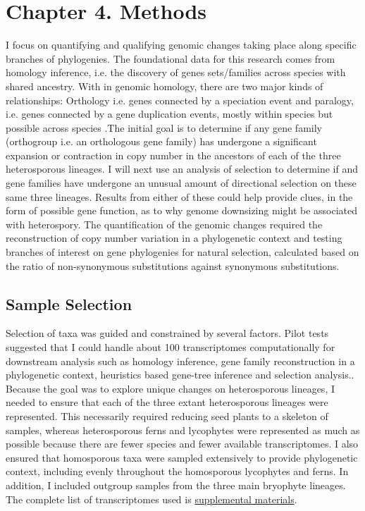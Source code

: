 \chapter{Chapter 4. Methods}

I focus on quantifying and qualifying genomic changes taking place along specific branches of phylogenies. The foundational data for this research comes from homology inference, i.e. the discovery of genes sets/families across species with shared ancestry. With in genomic homology, there are two major kinds of relationships: Orthology i.e. genes connected by a speciation event and paralogy, i.e. genes connected by a gene duplication events, mostly within species but possible across species \cite{Jensen2001-yf}.The initial goal is to determine if any gene family (orthogroup i.e. an orthologous gene family) has undergone a significant expansion or contraction in copy number in the ancestors of each of the three heterosporous lineages. I will next use an analysis of selection to determine if and gene families have undergone an unusual amount of directional selection on these same three lineages.  Results from either of these could help provide clues, in the form of possible gene function, as to why genome downsizing might be associated with heterospory. The quantification of the genomic changes required the reconstruction of copy number variation in a phylogenetic context and testing branches of interest on gene phylogenies for natural selection, calculated based on the ratio of non-synonymous substitutions against synonymous substitutions.

\section{Sample Selection}

Selection of taxa was guided and constrained by several factors. Pilot tests suggested that I could handle about 100 transcriptomes computationally for downstream analysis such as homology inference, gene family reconstruction in a phylogenetic context, heuristics based gene-tree inference and selection analysis.. Because the goal was to explore unique changes on heterosporous lineages, I needed to ensure that each of the three extant heterosporous lineages were represented. This necessarily required reducing seed plants to a skeleton of samples, whereas heterosporous ferns and lycophytes were represented as much as possible because there are fewer species and fewer available transcriptomes. I also ensured that homosporous taxa were sampled extensively to provide phylogenetic context, including evenly throughout the homosporous lycophytes and ferns. In addition, I included outgroup samples from the three main bryophyte lineages. The complete list of transcriptomes used is \href{https://uah0-my.sharepoint.com/:x:/g/personal/rrd0009_uah_edu/ERrv2rtJLe9EqJFMda1X7TQBX8BZpV3mMbJMVwOvgfyrFw?e=kD5W1O}{supplemental materials}.

